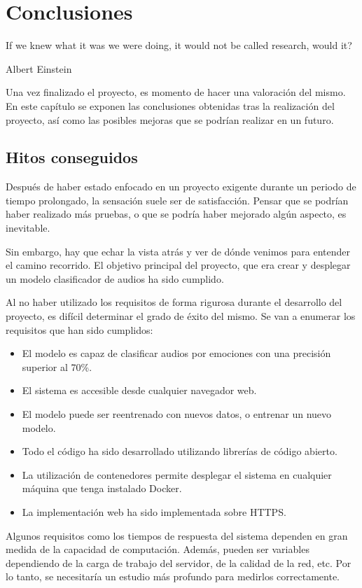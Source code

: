 \chapter{Conclusiones}\label{chp-04}

\epigraph{If we knew what it was we were doing, it would not be called research, would it?}{Albert Einstein}

Una vez finalizado el proyecto, es momento de hacer una valoración del mismo. 
En este capítulo se exponen las conclusiones obtenidas tras la realización del proyecto, así como las posibles mejoras que se podrían realizar en un futuro.

\section{Hitos conseguidos}
Después de haber estado enfocado en un proyecto exigente durante un periodo de tiempo prolongado, la sensación suele ser de satisfacción.
Pensar que se podrían haber realizado más pruebas, o que se podría haber mejorado algún aspecto, es inevitable.

Sin embargo, hay que echar la vista atrás y ver de dónde venimos para entender el camino recorrido.
El objetivo principal del proyecto, que era crear y desplegar un modelo clasificador de audios ha sido cumplido.

Al no haber utilizado los requisitos de forma rigurosa durante el desarrollo del proyecto, es difícil determinar el grado de éxito del mismo.
Se van a enumerar los requisitos que han sido cumplidos:

\begin{itemize}
    \item El modelo es capaz de clasificar audios por emociones con una precisión superior al 70\%.
    \item El sistema es accesible desde cualquier navegador web.
    \item El modelo puede ser reentrenado con nuevos datos, o entrenar un nuevo modelo.
    \item Todo el código ha sido desarrollado utilizando librerías de código abierto.
    \item La utilización de contenedores permite desplegar el sistema en cualquier máquina que tenga instalado Docker.
    \item La implementación web ha sido implementada sobre HTTPS.
\end{itemize}

Algunos requisitos como los tiempos de respuesta del sistema dependen en gran medida de la capacidad de computación.
Además, pueden ser variables dependiendo de la carga de trabajo del servidor, de la calidad de la red, etc.
Por lo tanto, se necesitaría un estudio más profundo para medirlos correctamente.



